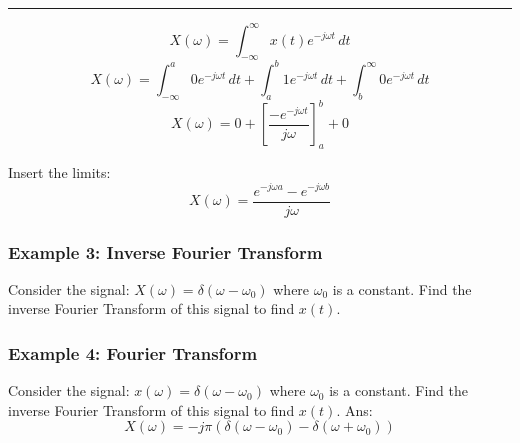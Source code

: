 \noindent\rule{\textwidth}{1pt}
$$X(\omega)=\int_{-\infty}^{\infty}x(t)e^{ -j\omega t }  \, dt $$
$$X(\omega)=\int_{-\infty}^{a}0e^{ -j\omega t }  \, dt +\int_{a}^{b}1e^{ -j\omega t }  \, dt +\int_{b}^{\infty}0e^{ -j\omega t }  \, dt $$
$$X(\omega)=0+\left[\frac{-e^{-j\omega t}}{j\omega} \right]_a^b+0$$

Insert the limits:
$$X(\omega)=\frac{e^{-j\omega a}-e^{-j\omega b}}{j\omega}$$
\subsubsection{Example 3: Inverse Fourier Transform}
Consider the signal: $X(\omega)=\delta(\omega-\omega_0)$ where $\omega_{0}$ is a constant. Find the inverse Fourier Transform of this signal to find $x(t)$.


\subsubsection{Example 4: Fourier Transform}
Consider the signal: $x(\omega)=\delta(\omega-\omega_0)$ where $\omega_{0}$ is a constant. Find the inverse Fourier Transform of this signal to find $x(t)$.
Ans:
$$X(\omega)=-j\pi(\delta(\omega-\omega_0)-\delta(\omega+\omega_0))$$

